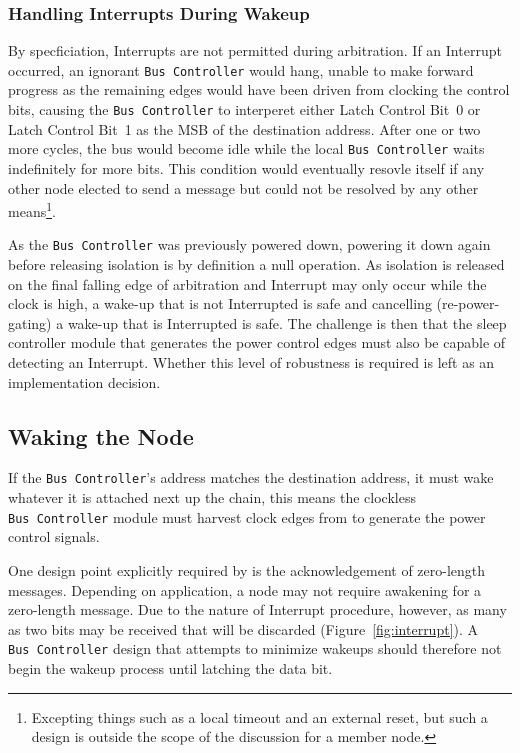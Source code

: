 \subsubsection{Handling Interrupts During Wakeup}
\label{sec:power-bus-controller-wakeup-int}
By specficiation, Interrupts are not permitted during arbitration. If an
Interrupt occurred, an ignorant {\tt Bus~Controller} would hang, unable to
make forward progress as the remaining edges would have been driven from
clocking the control bits, causing the {\tt Bus~Controller} to interperet
either Latch Control Bit~0 or Latch Control Bit~1 as the MSB of the
destination address. After one or two more cycles, the bus would become idle
while the local {\tt Bus~Controller} waits indefinitely for more bits. This
condition would eventually resovle itself if any other node elected to send a
message but could not be resolved by any other means\footnote{
  Excepting things such as a local timeout and an external reset, but such
  a design is outside the scope of the discussion for a \bus member node.}.

As the {\tt Bus~Controller} was previously powered down, powering it down
again before releasing isolation is by definition a null operation. As
isolation is released on the final falling edge of arbitration and Interrupt
may only occur while the clock is high, a wake-up that is not Interrupted is
safe and cancelling (re-power-gating) a wake-up that is Interrupted is safe.
The challenge is then that the sleep controller module that generates the
power control edges must also be capable of detecting an Interrupt. Whether
this level of robustness is required is left as an implementation decision.

\subsection{Waking the Node}
If the {\tt Bus~Controller}'s address matches the destination address, it must
wake whatever it is attached next up the chain, this means the clockless
{\tt Bus~Controller} module must harvest clock edges from \bus to generate the
power control signals.

One design point explicitly required by \bus is the acknowledgement of
zero-length messages. Depending on application, a node may not require
awakening for a zero-length message. Due to the nature of \bus Interrupt
procedure, however, as many as two bits may be received that will be discarded
(Figure~\ref{fig:interrupt}). A {\tt Bus~Controller} design that attempts to
minimize wakeups should therefore not begin the wakeup process until latching
the {\em {}} data bit.

